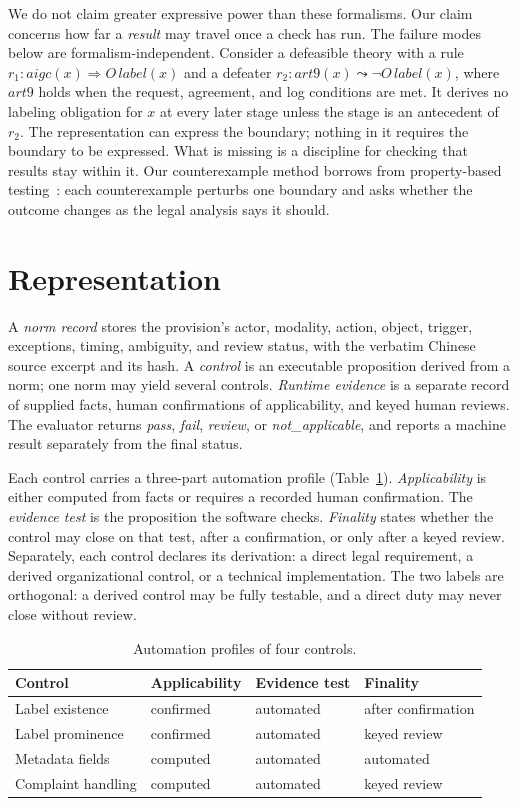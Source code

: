 \documentclass[sigconf,review,anonymous]{acmart}
\begin{document}
We do not claim greater expressive power than these formalisms. Our claim concerns how far a \emph{result} may travel once a check has run. The failure modes below are formalism-independent. Consider a defeasible theory with a rule $r_1\colon \mathit{aigc}(x) \Rightarrow O\,\mathit{label}(x)$ and a defeater $r_2\colon \mathit{art9}(x) \leadsto \neg O\,\mathit{label}(x)$, where $\mathit{art9}$ holds when the request, agreement, and log conditions are met. It derives no labeling obligation for $x$ at every later stage unless the stage is an antecedent of $r_2$. The representation can express the boundary; nothing in it requires the boundary to be expressed. What is missing is a discipline for checking that results stay within it. Our counterexample method borrows from property-based testing~\cite{claessen2000quickcheck}: each counterexample perturbs one boundary and asks whether the outcome changes as the legal analysis says it should.

\section{Representation}

A \emph{norm record} stores the provision's actor, modality, action, object, trigger, exceptions, timing, ambiguity, and review status, with the verbatim Chinese source excerpt and its hash. A \emph{control} is an executable proposition derived from a norm; one norm may yield several controls. \emph{Runtime evidence} is a separate record of supplied facts, human confirmations of applicability, and keyed human reviews. The evaluator returns \emph{pass}, \emph{fail}, \emph{review}, or \emph{not\_applicable}, and reports a machine result separately from the final status.

Each control carries a three-part automation profile (Table~\ref{tab:profile}). \emph{Applicability} is either computed from facts or requires a recorded human confirmation. The \emph{evidence test} is the proposition the software checks. \emph{Finality} states whether the control may close on that test, after a confirmation, or only after a keyed review. Separately, each control declares its derivation: a direct legal requirement, a derived organizational control, or a technical implementation. The two labels are orthogonal: a derived control may be fully testable, and a direct duty may never close without review.

\begin{table}[t]
\caption{Automation profiles of four controls.}
\label{tab:profile}
\small
\begin{tabular}{@{}p{2.5cm}p{1.6cm}p{1.5cm}p{1.6cm}@{}}
\toprule
Control & Applicability & Evidence test & Finality \\
\midrule
Label existence & confirmed & automated & after confirmation \\
Label prominence & confirmed & automated & keyed review \\
Metadata fields & computed & automated & automated \\
Complaint handling & computed & automated & keyed review \\
\bottomrule
\end{tabular}
\end{table}
\end{document}
